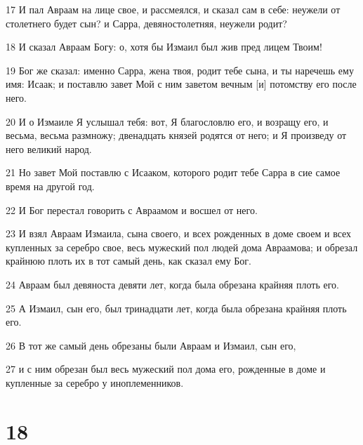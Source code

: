 \par 17 И пал Авраам на лице свое, и рассмеялся, и сказал сам в себе: неужели от столетнего будет сын? и Сарра, девяностолетняя, неужели родит?
\par 18 И сказал Авраам Богу: о, хотя бы Измаил был жив пред лицем Твоим!
\par 19 Бог же сказал: именно Сарра, жена твоя, родит тебе сына, и ты наречешь ему имя: Исаак; и поставлю завет Мой с ним заветом вечным [и] потомству его после него.
\par 20 И о Измаиле Я услышал тебя: вот, Я благословлю его, и возращу его, и весьма, весьма размножу; двенадцать князей родятся от него; и Я произведу от него великий народ.
\par 21 Но завет Мой поставлю с Исааком, которого родит тебе Сарра в сие самое время на другой год.
\par 22 И Бог перестал говорить с Авраамом и восшел от него.
\par 23 И взял Авраам Измаила, сына своего, и всех рожденных в доме своем и всех купленных за серебро свое, весь мужеский пол людей дома Авраамова; и обрезал крайнюю плоть их в тот самый день, как сказал ему Бог.
\par 24 Авраам был девяноста девяти лет, когда была обрезана крайняя плоть его.
\par 25 А Измаил, сын его, был тринадцати лет, когда была обрезана крайняя плоть его.
\par 26 В тот же самый день обрезаны были Авраам и Измаил, сын его,
\par 27 и с ним обрезан был весь мужеский пол дома его, рожденные в доме и купленные за серебро у иноплеменников.

\chapter{18}

